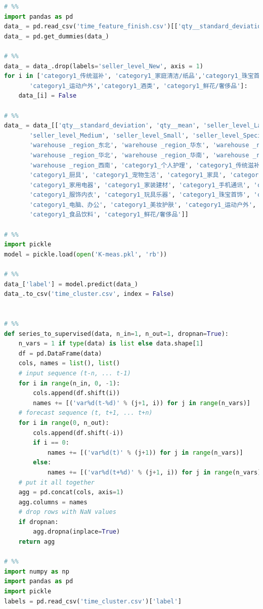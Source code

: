 \documentclass[withoutpreface,bwprint]{cumcmthesis}
\begin{document}
\begin{lstlisting}[language=python]
# %%
import pandas as pd
data_ = pd.read_csv('time_feature_finish.csv')[['qty__standard_deviation', 'qty__mean', 'seller_level', 'warehouse _region', 'category1']]
data_ = pd.get_dummies(data_)

# %%
data_ = data_.drop(labels='seller_level_New', axis = 1)
for i in ['category1_传统滋补', 'category1_家庭清洁/纸品','category1_珠宝首饰',
       'category1_运动户外','category1_酒类', 'category1_鲜花/奢侈品']:
    data_[i] = False

# %%
data_ = data_[['qty__standard_deviation', 'qty__mean', 'seller_level_Large',
       'seller_level_Medium', 'seller_level_Small', 'seller_level_Special',
       'warehouse _region_东北', 'warehouse _region_华东', 'warehouse _region_华中',
       'warehouse _region_华北', 'warehouse _region_华南', 'warehouse _region_西北',
       'warehouse _region_西南', 'category1_个人护理', 'category1_传统滋补',
       'category1_厨具', 'category1_宠物生活', 'category1_家具', 'category1_家庭清洁/纸品',
       'category1_家用电器', 'category1_家装建材', 'category1_手机通讯', 'category1_数码',
       'category1_服饰内衣', 'category1_玩具乐器', 'category1_珠宝首饰', 'category1_生活日用',
       'category1_电脑、办公', 'category1_美妆护肤', 'category1_运动户外', 'category1_酒类',
       'category1_食品饮料', 'category1_鲜花/奢侈品']]

# %%
import pickle
model = pickle.load(open('K-meas.pkl', 'rb'))

# %%
data_['label'] = model.predict(data_)
data_.to_csv('time_cluster.csv', index = False)


# %%
def series_to_supervised(data, n_in=1, n_out=1, dropnan=True):
    n_vars = 1 if type(data) is list else data.shape[1]
    df = pd.DataFrame(data)
    cols, names = list(), list()
    # input sequence (t-n, ... t-1)
    for i in range(n_in, 0, -1):
        cols.append(df.shift(i))
        names += [('var%d(t-%d)' % (j+1, i)) for j in range(n_vars)]
    # forecast sequence (t, t+1, ... t+n)
    for i in range(0, n_out):
        cols.append(df.shift(-i))
        if i == 0:
            names += [('var%d(t)' % (j+1)) for j in range(n_vars)]
        else:
            names += [('var%d(t+%d)' % (j+1, i)) for j in range(n_vars)]
    # put it all together
    agg = pd.concat(cols, axis=1)
    agg.columns = names
    # drop rows with NaN values
    if dropnan:
        agg.dropna(inplace=True)
    return agg

# %%
import numpy as np
import pandas as pd
import pickle
labels = pd.read_csv('time_cluster.csv')['label']


\end{lstlisting}
\end{document}
